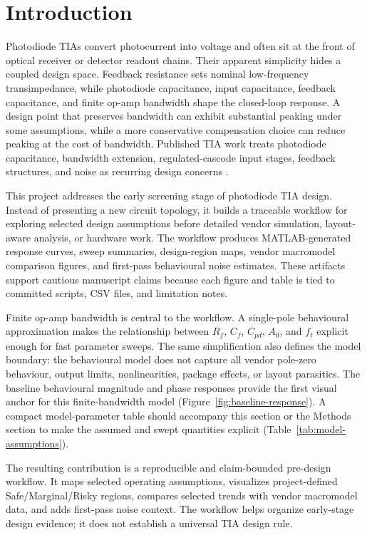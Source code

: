 \section{Introduction}

Photodiode TIAs convert photocurrent into voltage and often sit at the front of optical receiver or detector readout chains. Their apparent simplicity hides a coupled design space. Feedback resistance sets nominal low-frequency transimpedance, while photodiode capacitance, input capacitance, feedback capacitance, and finite op-amp bandwidth shape the closed-loop response. A design point that preserves bandwidth can exhibit substantial peaking under some assumptions, while a more conservative compensation choice can reduce peaking at the cost of bandwidth. Published TIA work treats photodiode capacitance, bandwidth extension, regulated-cascode input stages, feedback structures, and noise as recurring design concerns \citep{ANALUI_2004_BW_ENHANCEMENT,LU_2007_BROADBAND_TIA,PARK_YOO_2004_RGC_TIA,NOH_2020_CF_TIA_DC_LOOP}.

This project addresses the early screening stage of photodiode TIA design. Instead of presenting a new circuit topology, it builds a traceable workflow for exploring selected design assumptions before detailed vendor simulation, layout-aware analysis, or hardware work. The workflow produces MATLAB-generated response curves, sweep summaries, design-region maps, vendor macromodel comparison figures, and first-pass behavioural noise estimates. These artifacts support cautious manuscript claims because each figure and table is tied to committed scripts, CSV files, and limitation notes.

Finite op-amp bandwidth is central to the workflow. A single-pole behavioural approximation makes the relationship between $R_f$, $C_f$, $C_{pd}$, $A_0$, and $f_t$ explicit enough for fast parameter sweeps. The same simplification also defines the model boundary: the behavioural model does not capture all vendor pole-zero behaviour, output limits, nonlinearities, package effects, or layout parasitics. The baseline behavioural magnitude and phase responses provide the first visual anchor for this finite-bandwidth model (Figure~\ref{fig:baseline-response}). A compact model-parameter table should accompany this section or the Methods section to make the assumed and swept quantities explicit (Table~\ref{tab:model-assumptions}).

The resulting contribution is a reproducible and claim-bounded pre-design workflow. It maps selected operating assumptions, visualizes project-defined Safe/Marginal/Risky regions, compares selected trends with vendor macromodel data, and adds first-pass noise context. The workflow helps organize early-stage design evidence; it does not establish a universal TIA design rule.
